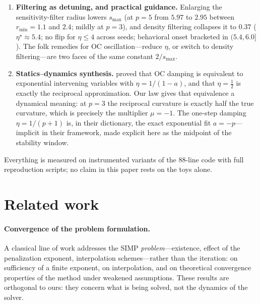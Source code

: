 \documentclass[11pt,a4paper]{article}
\newcommand{\smax}{s_{\max}}
\newcommand{\etastar}{\eta^{\star}}
\begin{document}
\begin{enumerate}
  nearby asymmetric fixed point whose spectrum has shed the negative
  eigenvalue, at essentially unchanged compliance. Accordingly, $2/\smax$
  must be stated as the flip boundary \emph{of the positive branch}, not as
  a global stability window.
\item \textbf{Filtering as detuning, and practical guidance.} Enlarging the
  sensitivity-filter radius lowers $\smax$ (at $p=5$ from $5.97$ to $2.95$
  between $r_{\min}=1.1$ and $2.4$; mildly at $p=3$), and density filtering
  collapses it to $0.37$ ($\etastar\approx5.4$; no flip for $\eta\le4$
  across seeds; behavioral onset bracketed in $(5.4,6.0]$). The folk
  remedies for OC oscillation---reduce $\eta$, or switch to density
  filtering---are two faces of the same constant $2/\smax$.
\item \textbf{Statics--dynamics synthesis.} \citet{groenwold2008} proved
  that OC damping is equivalent to exponential intervening variables with
  $\eta=1/(1-a)$, and that $\eta=\tfrac12$ is exactly the reciprocal
  approximation. Our law gives that equivalence a dynamical meaning: at
  $p=3$ the reciprocal curvature is exactly half the true curvature, which
  is precisely the multiplier $\mu=-1$. The one-step damping $\eta=1/(p+1)$
  is, in their dictionary, the exact exponential fit $a=-p$---implicit in
  their framework, made explicit here as the midpoint of the stability
  window.
\end{enumerate}

Everything is measured on instrumented variants of the 88-line code
\citep{andreassen2011top88} with full reproduction scripts; no claim in
this paper rests on the toys alone.

\section{Related work}\label{sec:related}

\paragraph{Convergence of the problem formulation.} A classical line of
work addresses the SIMP \emph{problem}---existence, effect of the
penalization exponent, interpolation schemes---rather than the iteration:
\citet{rietz2001} on sufficiency of a finite exponent,
\citet{stolpe2001} on interpolation, and \citet{martinez2005} on
theoretical convergence properties of the method under weakened
assumptions. These results are orthogonal to ours: they concern what is
being solved, not the dynamics of the solver.
\end{document}
